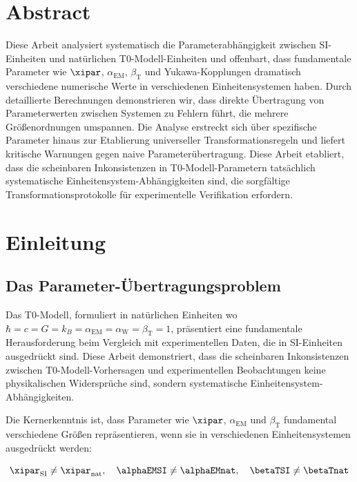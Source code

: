 \section*{Abstract}
		Diese Arbeit analysiert systematisch die Parameterabhängigkeit zwischen SI-Einheiten und natürlichen T0-Modell-Einheiten und offenbart, dass fundamentale Parameter wie $\xipar$, $\alpha_{\text{EM}}$, $\beta_{\text{T}}$ und Yukawa-Kopplungen dramatisch verschiedene numerische Werte in verschiedenen Einheitensystemen haben. Durch detaillierte Berechnungen demonstrieren wir, dass direkte Übertragung von Parameterwerten zwischen Systemen zu Fehlern führt, die mehrere Größenordnungen umspannen. Die Analyse erstreckt sich über spezifische Parameter hinaus zur Etablierung universeller Transformationsregeln und liefert kritische Warnungen gegen naive Parameterübertragung. Diese Arbeit etabliert, dass die scheinbaren Inkonsistenzen in T0-Modell-Parametern tatsächlich systematische Einheitensystem-Abhängigkeiten sind, die sorgfältige Transformationsprotokolle für experimentelle Verifikation erfordern.

	
	
	\section{Einleitung}
	\label{sec:einleitung}
	
	\subsection{Das Parameter-Übertragungsproblem}
	\label{subsec:parameter_problem}
	
	Das T0-Modell, formuliert in natürlichen Einheiten wo $\hbar = c = G = k_B = \alpha_{\text{EM}} = \alpha_{\text{W}} = \beta_{\text{T}} = 1$, präsentiert eine fundamentale Herausforderung beim Vergleich mit experimentellen Daten, die in SI-Einheiten ausgedrückt sind. Diese Arbeit demonstriert, dass die scheinbaren Inkonsistenzen zwischen T0-Modell-Vorhersagen und experimentellen Beobachtungen keine physikalischen Widersprüche sind, sondern systematische Einheitensystem-Abhängigkeiten.
	
	Die Kernerkenntnis ist, dass Parameter wie $\xipar$, $\alpha_{\text{EM}}$ und $\beta_{\text{T}}$ fundamental verschiedene Größen repräsentieren, wenn sie in verschiedenen Einheitensystemen ausgedrückt werden:
	
	$$\xipar_{\text{SI}} \neq \xipar_{\text{nat}}, \quad \alphaEMSI \neq \alphaEMnat, \quad \betaTSI \neq \betaTnat$$
	
